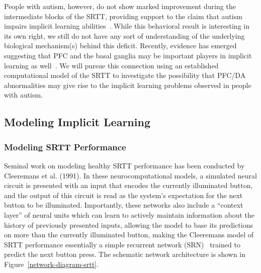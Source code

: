 People with autism, however, do not show marked improvement during the intermediate blocks of the SRTT, providing support to the claim that autism impairs implicit learning abilities~\cite{RefWorks:148}.  While this behavioral result is interesting in its own right, we still do not have any sort of understanding of the underlying biological mechanism(s) behind this deficit.  Recently, evidence has emerged suggesting that PFC and the basal ganglia may be important players in implicit learning as well~\cite{RefWorks:109,PascualLeone:2004:PFC_Implicit}.  We will pursue this connection using an established computational model of the SRTT to investigate the possibility that PFC/DA abnormalities may give rise to the implicit learning problems observed in people with autism.



\subsection{Modeling Implicit Learning}

\subsubsection{Modeling SRTT Performance}
Seminal work on modeling healthy SRTT performance has been conducted by \nocite{Cleeremans:1991:SSRT} Cleeremans et al. (1991).  In these neurocomputational models, a simulated neural circuit is presented with an input that encodes the currently illuminated button, and the output of this circuit is read as the system's expectation for the next button to be illuminated.  Importantly, these networks also include a ``context layer'' of neural units which can learn to actively maintain information about the history of previously presented inputs, allowing the model to base its predictions on more than the currently illuminated button, making the Cleeremans model of SRTT performance essentially a simple recurrent network (SRN)~\cite{ElmanJ:1990:SRN} trained to predict the next button press. The schematic network architecture is shown in Figure~\ref{network-diagram-srtt}.  

